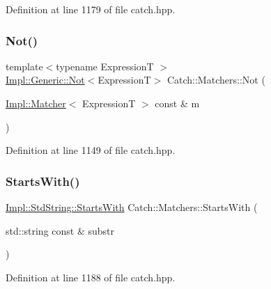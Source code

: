 Definition at line 1179 of file catch.\+hpp.

\hypertarget{namespace_catch_1_1_matchers_ae3c192dc15c973c38f07376d4debdc34}{}\label{namespace_catch_1_1_matchers_ae3c192dc15c973c38f07376d4debdc34} 
\subsubsection{\texorpdfstring{Not()}{Not()}}
{\footnotesize\ttfamily template$<$typename ExpressionT $>$ \\
\hyperlink{class_catch_1_1_matchers_1_1_impl_1_1_generic_1_1_not}{Impl\+::\+Generic\+::\+Not}$<$ExpressionT$>$ Catch\+::\+Matchers\+::\+Not (\begin{DoxyParamCaption}\item[{\hyperlink{struct_catch_1_1_matchers_1_1_impl_1_1_matcher}{Impl\+::\+Matcher}$<$ ExpressionT $>$ const \&}]{m }\end{DoxyParamCaption})\hspace{0.3cm}{\ttfamily [inline]}}



Definition at line 1149 of file catch.\+hpp.

\hypertarget{namespace_catch_1_1_matchers_a9b6a7704df7d0717dc6686fd2055ffea}{}\label{namespace_catch_1_1_matchers_a9b6a7704df7d0717dc6686fd2055ffea} 
\subsubsection{\texorpdfstring{Starts\+With()}{StartsWith()}\hspace{0.1cm}{\footnotesize\ttfamily [1/2]}}
{\footnotesize\ttfamily \hyperlink{struct_catch_1_1_matchers_1_1_impl_1_1_std_string_1_1_starts_with}{Impl\+::\+Std\+String\+::\+Starts\+With} Catch\+::\+Matchers\+::\+Starts\+With (\begin{DoxyParamCaption}\item[{std\+::string const \&}]{substr }\end{DoxyParamCaption})\hspace{0.3cm}{\ttfamily [inline]}}



Definition at line 1188 of file catch.\+hpp.

\hypertarget{namespace_catch_1_1_matchers_a031985c11b8c8bb62585b3904f9fd2b0}{}\label{namespace_catch_1_1_matchers_a031985c11b8c8bb62585b3904f9fd2b0} 
